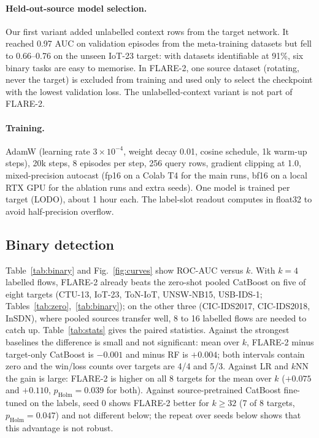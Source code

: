 \documentclass[pdflatex,sn-mathphys-num]{sn-jnl}%
\begin{document}
\paragraph{Held-out-source model selection.}
Our first variant added unlabelled context rows from the target network.
It reached 0.97 AUC on validation episodes from the meta-training datasets but fell to 0.66--0.76 on the unseen IoT-23 target: with datasets identifiable at 91\%, six binary tasks are easy to memorise.
In FLARE-2, one source dataset (rotating, never the target) is excluded from training and used only to select the checkpoint with the lowest validation loss.
The unlabelled-context variant is not part of FLARE-2.

\paragraph{Training.}
AdamW (learning rate $3\times10^{-4}$, weight decay 0.01, cosine schedule, 1k warm-up steps), 20k steps, 8 episodes per step, 256 query rows, gradient clipping at 1.0, mixed-precision autocast (fp16 on a Colab T4 for the main runs, bf16 on a local RTX GPU for the ablation runs and extra seeds).
One model is trained per target (LODO), about 1 hour each.
The label-slot readout computes in float32 to avoid half-precision overflow.

\subsection{Binary detection}
Table~\ref{tab:binary} and Fig.~\ref{fig:curves} show ROC-AUC versus $k$.
With $k=4$ labelled flows, FLARE-2 already beats the zero-shot pooled CatBoost on five of eight targets (CTU-13, IoT-23, ToN-IoT, UNSW-NB15, USB-IDS-1; Tables~\ref{tab:zero},~\ref{tab:binary}); on the other three (CIC-IDS2017, CIC-IDS2018, InSDN), where pooled sources transfer well, 8 to 16 labelled flows are needed to catch up.
Table~\ref{tab:stats} gives the paired statistics.
Against the strongest baselines the difference is small and not significant: mean over $k$, FLARE-2 minus target-only CatBoost is $-0.001$ and minus RF is $+0.004$; both intervals contain zero and the win/loss counts over targets are 4/4 and 5/3.
Against LR and $k$NN the gain is large: FLARE-2 is higher on all 8 targets for the mean over $k$ ($+0.075$ and $+0.110$, $p_{\text{Holm}}=0.039$ for both).
Against source-pretrained CatBoost fine-tuned on the labels, seed 0 shows FLARE-2 better for $k\ge 32$ (7 of 8 targets, $p_{\text{Holm}}=0.047$) and not different below; the repeat over seeds below shows that this advantage is not robust.
\end{document}
